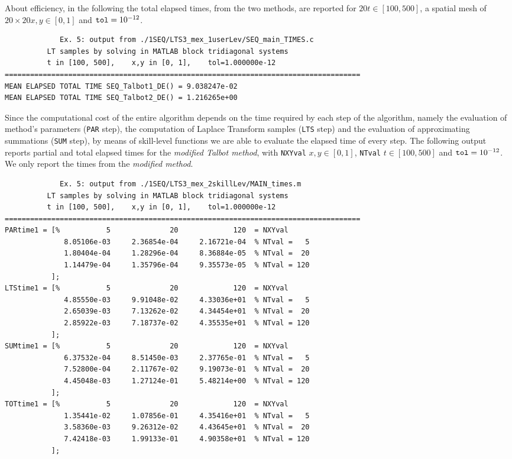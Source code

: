 \documentclass[a4paper,10pt]{report}%
\begin{document}
About efficiency, in the following the total elapsed times, from the two methods, are reported for
$20 t\in[100,500]$, a spatial mesh of $20\times 20 x,y\in[0,1]$ and ${\tt tol}=10^{-12}$.
\begin{lstlisting}
             Ex. 5: output from ./1SEQ/LTS3_mex_1userLev/SEQ_main_TIMES.c
          LT samples by solving in MATLAB block tridiagonal systems
          t in [100, 500],    x,y in [0, 1],    tol=1.000000e-12
====================================================================================
MEAN ELAPSED TOTAL TIME SEQ_Talbot1_DE() = 9.038247e-02
MEAN ELAPSED TOTAL TIME SEQ_Talbot2_DE() = 1.216265e+00
\end{lstlisting}
Since the computational cost of the entire algorithm depends on the time required by each step of
the algorithm, namely the evaluation of method's parameters ({\tt PAR} step), the computation of Laplace
Transform samples ({\tt LTS} step) and the evaluation of approximating summations ({\tt SUM} step), by means of
skill-level functions we are able to evaluate the elapsed time of every step. The following output reports
partial and total elapsed times for the {\em modified Talbot method}, with {\tt NXYval} $x,y\in[0,1]$,
{\tt NTval} $t\in[100,500]$ and ${\tt tol}=10^{-12}$.
We only report the times from the {\em modified method}.
\begin{lstlisting}
             Ex. 5: output from ./1SEQ/LTS3_mex_2skillLev/MAIN_times.m
          LT samples by solving in MATLAB block tridiagonal systems
          t in [100, 500],    x,y in [0, 1],    tol=1.000000e-12
====================================================================================
PARtime1 = [%           5              20             120  = NXYval
              8.05106e-03     2.36854e-04     2.16721e-04  % NTval =   5
              1.80404e-04     1.28296e-04     8.36884e-05  % NTval =  20
              1.14479e-04     1.35796e-04     9.35573e-05  % NTval = 120
           ];
LTStime1 = [%           5              20             120  = NXYval
              4.85550e-03     9.91048e-02     4.33036e+01  % NTval =   5
              2.65039e-03     7.13262e-02     4.34454e+01  % NTval =  20
              2.85922e-03     7.18737e-02     4.35535e+01  % NTval = 120
           ];
SUMtime1 = [%           5              20             120  = NXYval
              6.37532e-04     8.51450e-03     2.37765e-01  % NTval =   5
              7.52800e-04     2.11767e-02     9.19073e-01  % NTval =  20
              4.45048e-03     1.27124e-01     5.48214e+00  % NTval = 120
           ];
TOTtime1 = [%           5              20             120  = NXYval
              1.35441e-02     1.07856e-01     4.35416e+01  % NTval =   5
              3.58360e-03     9.26312e-02     4.43645e+01  % NTval =  20
              7.42418e-03     1.99133e-01     4.90358e+01  % NTval = 120
           ];
\end{lstlisting}
\end{document}
